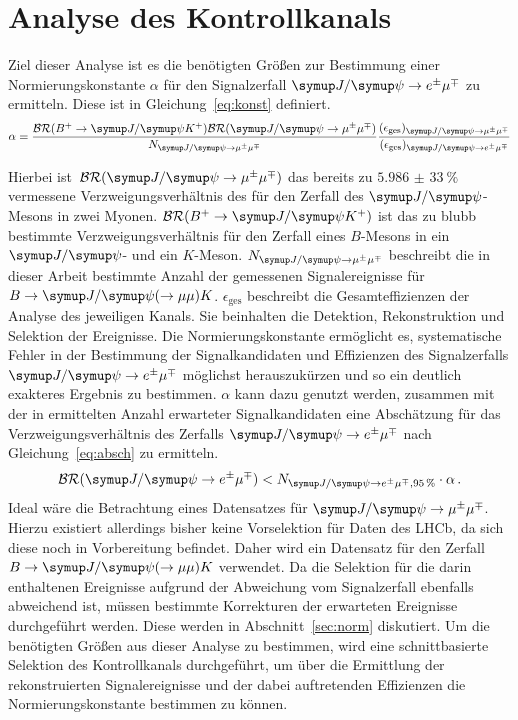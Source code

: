 \chapter{Analyse des Kontrollkanals}
\label{chap:4}
%
Ziel dieser Analyse ist es die benötigten Größen zur Bestimmung einer Normierungskonstante $\alpha$ für den Signalzerfall $\signal$ zu ermitteln. Diese ist in Gleichung~\eqref{eq:konst} definiert.
%
\begin{equation}
  \alpha=\frac{\mathcal{BR}(B^{+}\rightarrow\jpsi K^{+})\mathcal{BR}(\kontroll)}{N_{\kontroll}}\frac{(\epsilon_{\text{ges}})_{\kontroll}}{(\epsilon_{\text{ges}})_{\signal}}
  \label{eq:konst}
\end{equation}
%

Hierbei ist~$\mathcal{BR}(\kontroll)$ das bereits zu $\SI{5,986(33)}{\percent}$ \cite{pdg} vermessene Verzweigungsverhältnis des für den Zerfall des $\jpsi$-Mesons in zwei Myonen. $\mathcal{BR}(B^{+}\rightarrow\jpsi K^{+})$ ist das zu {blubb} bestimmte Verzweigungsverhältnis für den Zerfall eines $B$-Mesons in ein $\jpsi$- und ein $K$-Meson. $N_{\kontroll}$ beschreibt die in dieser Arbeit bestimmte Anzahl der gemessenen Signalereignisse für $B\rightarrow\jpsi(\rightarrow\mu\mu) K$.
$\epsilon_{\text{ges}}$ beschreibt die Gesamteffizienzen der Analyse des jeweiligen Kanals. Sie beinhalten die Detektion,
Rekonstruktion und Selektion der Ereignisse. Die Normierungskonstante ermöglicht es, systematische Fehler in der Bestimmung der
Signalkandidaten und Effizienzen des Signalzerfalls $\signal$ möglichst herauszukürzen und so ein deutlich exakteres Ergebnis
zu bestimmen. $\alpha$ kann dazu genutzt werden, zusammen mit der in \cite{ba-maik} ermittelten Anzahl erwarteter
Signalkandidaten eine Abschätzung für das Verzweigungsverhältnis des Zerfalls $\signal$ nach Gleichung~\eqref{eq:absch} zu ermitteln.
%
\begin{equation}
  \mathcal{BR}(\signal)<N_{\signal, \SI{95}{\percent}}\cdot\alpha\, .
  \label{eq:absch}
\end{equation}
%
Ideal wäre die Betrachtung eines Datensatzes für $\kontroll$. Hierzu existiert allerdings bisher keine Vorselektion für Daten des LHCb, da sich diese noch in Vorbereitung befindet. Daher wird ein Datensatz für den Zerfall $B\rightarrow\jpsi(\rightarrow\mu\mu) K$ verwendet.
Da die Selektion für die darin enthaltenen Ereignisse aufgrund der Abweichung vom Signalzerfall ebenfalls abweichend ist, müssen bestimmte Korrekturen der erwarteten Ereignisse durchgeführt werden. Diese werden in Abschnitt~\ref{sec:norm} diskutiert.
Um die benötigten Größen aus dieser Analyse zu bestimmen, wird eine schnittbasierte Selektion des Kontrollkanals
durchgeführt, um über die Ermittlung der rekonstruierten Signalereignisse und der dabei auftretenden Effizienzen
die Normierungskonstante bestimmen zu können.
%
